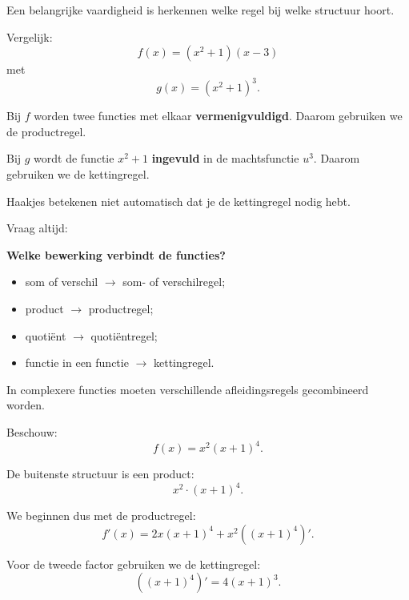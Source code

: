 \documentclass{ximera}
\begin{document}


Een belangrijke vaardigheid is herkennen welke regel bij welke structuur
hoort.

Vergelijk:
\[f(x)=(x^2+1)(x-3)\]
met
\[g(x)=(x^2+1)^3.\]

Bij $f$ worden twee functies met elkaar \textbf{vermenigvuldigd}.
Daarom gebruiken we de productregel.

Bij $g$ wordt de functie $x^2+1$ \textbf{ingevuld} in de machtsfunctie
$u^3$.
Daarom gebruiken we de kettingregel.


\begin{opmerking}
Haakjes betekenen niet automatisch dat je de kettingregel nodig hebt.

Vraag altijd:

\begin{center}
\textbf{Welke bewerking verbindt de functies?}
\end{center}

\begin{itemize}
  \item som of verschil $\longrightarrow$ som- of verschilregel;
  \item product $\longrightarrow$ productregel;
  \item quotiënt $\longrightarrow$ quotiëntregel;
  \item functie in een functie $\longrightarrow$ kettingregel.
\end{itemize}
\end{opmerking}




In complexere functies moeten verschillende afleidingsregels gecombineerd
worden.

Beschouw:
\[f(x)=x^2(x+1)^4.\]

De buitenste structuur is een product:
\[x^2\cdot(x+1)^4.\]

We beginnen dus met de productregel:
\[
f'(x)
=
2x(x+1)^4
+
x^2\left((x+1)^4\right)'.
\]

Voor de tweede factor gebruiken we de kettingregel:
\[
\left((x+1)^4\right)'
=
4(x+1)^3.
\]
\end{document}
